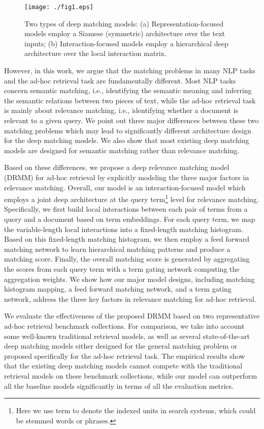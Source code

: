 \documentclass{sig-alternate-05-2015}
\begin{document}
\begin{figure*}[tbp]
\centering
\texttt{[image: ./fig1.eps]}
\caption{Two types of deep matching models: (a) Representation-focused models employ a Siamese (symmetric) architecture over the text inputs; (b) Interaction-focused models employ a hierarchical deep architecture over the local interaction matrix.}\label{fig1}
\end{figure*}

However, in this work, we argue that the matching problems in many NLP tasks and the ad-hoc retrieval task are fundamentally different. Most NLP tasks concern semantic matching, i.e., identifying the semantic meaning and inferring the semantic relations between two pieces of text, while the ad-hoc retrieval task is mainly about relevance matching, i.e., identifying whether a document is relevant to a given query. We point out three major differences between these two matching problems which may lead to significantly different architecture design for the deep matching models. We also show that most existing deep matching models are designed for semantic matching rather than relevance \mbox{matching}.

Based on these differences, we propose a deep relevance matching model (DRMM) for ad-hoc retrieval by explicitly modeling the three major factors in relevance matching. Overall, our model is an interaction-focused model which employs a joint deep architecture at the query term\footnote{Here we use term to denote the indexed units in search systems, which could be stemmed words or phrases.} level for relevance matching. Specifically, we first build local interactions between each pair of terms from a query and a document based on term embeddings. For each query term, we map the variable-length local interactions into a fixed-length matching histogram. Based on this fixed-length matching histogram, we then employ a feed forward matching network to learn hierarchical matching patterns and produce a matching score. Finally, the overall matching score is generated by aggregating the scores from each query term with a term gating network computing the aggregation weights. We show how our major model designs, including matching histogram mapping, a feed forward matching network, and a term gating network, address the three key factors in relevance matching for ad-hoc retrieval.

We evaluate the effectiveness of the proposed DRMM based on two representative ad-hoc retrieval benchmark collections. For comparison, we take into account some well-known traditional retrieval models, as well as several state-of-the-art deep matching models either designed for the general matching problem or proposed specifically for the ad-hoc retrieval task. The empirical results show that the existing deep matching models cannot compete with the traditional retrieval models on these benchmark collections, while our model can outperform all the baseline models significantly in terms of all the evaluation metrics.
\end{document}
